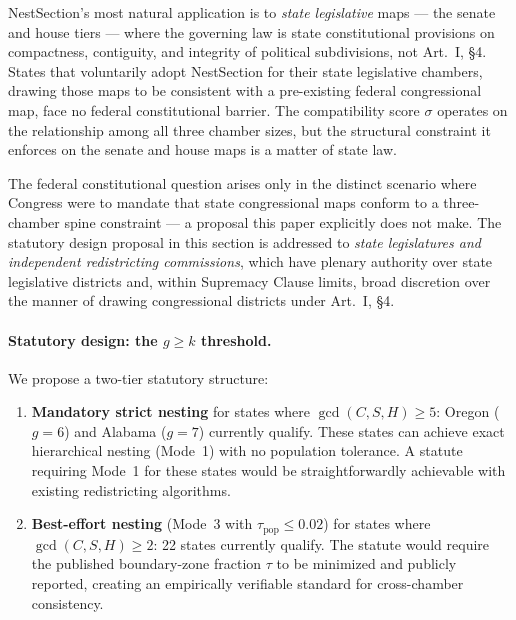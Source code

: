 NestSection's most natural application is to \emph{state legislative} maps
--- the senate and house tiers --- where the governing law is state
constitutional provisions on compactness, contiguity, and integrity of
political subdivisions, not Art.\ I, \S4.  States that voluntarily adopt
NestSection for their state legislative chambers, drawing those maps to be
consistent with a pre-existing federal congressional map, face no federal
constitutional barrier.  The compatibility score $\sigma$ operates on the
relationship among all three chamber sizes, but the structural constraint
it enforces on the senate and house maps is a matter of state law.

The federal constitutional question arises only in the distinct scenario where
Congress were to mandate that state congressional maps conform to a
three-chamber spine constraint --- a proposal this paper explicitly does not
make.  The statutory design proposal in this section is addressed to
\emph{state legislatures and independent redistricting commissions}, which
have plenary authority over state legislative districts and, within Supremacy
Clause limits, broad discretion over the manner of drawing congressional
districts under Art.\ I, \S4.

\paragraph{Statutory design: the $g \geq k$ threshold.}
We propose a two-tier statutory structure:
\begin{enumerate}
  \item \textbf{Mandatory strict nesting} for states where $\gcd(C,S,H) \geq 5$:
        Oregon ($g=6$) and Alabama ($g=7$) currently qualify.  These states
        can achieve exact hierarchical nesting (Mode~1) with no population
        tolerance.  A statute requiring Mode~1 for these states would be
        straightforwardly achievable with existing redistricting algorithms.
  \item \textbf{Best-effort nesting} (Mode~3 with $\tau_\text{pop} \leq 0.02$)
        for states where $\gcd(C,S,H) \geq 2$: 22 states currently qualify.
        The statute would require the published boundary-zone fraction $\tau$ to
        be minimized and publicly reported, creating an empirically verifiable
        standard for cross-chamber consistency.
\end{enumerate}

